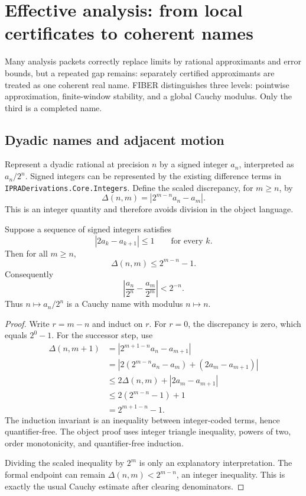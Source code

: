 \section{Effective analysis: from local certificates to coherent names}
\label{sec:analysis}

Many analysis packets correctly replace limits by rational approximants and
error bounds, but a repeated gap remains: separately certified approximants
are treated as one coherent real name.  FIBER distinguishes three levels:
pointwise approximation, finite-window stability, and a global Cauchy modulus.
Only the third is a completed name.

\subsection{Dyadic names and adjacent motion}

Represent a dyadic rational at precision \(n\) by a signed integer
\(a_n\), interpreted as \(a_n/2^n\).  Signed integers can be represented by the
existing difference terms in \texttt{IPRADerivations.Core.Integers}.  Define
the scaled discrepancy, for \(m\ge n\), by
\[
       \Delta(n,m)=\left|2^{m-n}a_n-a_m\right|.
\]
This is an integer quantity and therefore avoids division in the object
language.

\begin{theorem}
\label{thm:dyadic}
Suppose a sequence of signed integers satisfies
\[
        |2a_k-a_{k+1}|\le 1
        \qquad\text{for every }k.
\]
Then for all \(m\ge n\),
\[
        \Delta(n,m)\le 2^{m-n}-1.
\]
Consequently
\[
        \left|\frac{a_n}{2^n}-\frac{a_m}{2^m}\right|<2^{-n}.
\]
Thus \(n\mapsto a_n/2^n\) is a Cauchy name with modulus \(n\mapsto n\).
\end{theorem}

\begin{proof}
Write \(r=m-n\) and induct on \(r\).  For \(r=0\), the discrepancy is zero,
which equals \(2^0-1\).  For the successor step, use
\begin{align*}
\Delta(n,m+1)
 &=|2^{m+1-n}a_n-a_{m+1}|\\
 &=|2(2^{m-n}a_n-a_m)+(2a_m-a_{m+1})|\\
 &\le 2\Delta(n,m)+|2a_m-a_{m+1}|\\
 &\le 2(2^{m-n}-1)+1\\
 &=2^{m+1-n}-1.
\end{align*}
The induction invariant is an inequality between integer-coded terms, hence
quantifier-free.  The object proof uses integer triangle inequality, powers of
two, order monotonicity, and quantifier-free induction.

Dividing the scaled inequality by \(2^m\) is only an explanatory
interpretation.  The formal endpoint can remain
\(\Delta(n,m)<2^{m-n}\), an integer inequality.  This is exactly the usual
Cauchy estimate after clearing denominators.
\end{proof}

